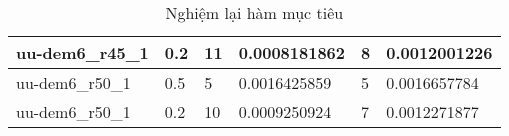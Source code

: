 \begin{table}[]
\begin{tabular}{|l|l|l|l|l|l|}
    uu-dem6\_r45\_1                                & 0.2                                         & 11                             & 0.0008181862                    & 8                              & 0.0012001226                    \\ \hline
    uu-dem6\_r50\_1                                & 0.5                                         & 5                              & 0.0016425859                    & 5                              & 0.0016657784                    \\ \hline
    uu-dem6\_r50\_1                                & 0.2                                         & 10                             & 0.0009250924                    & 7                              & 0.0012271877                    \\ \hline
    \end{tabular}
    \caption{Nghiệm lại hàm mục tiêu}
    \label{check_obj_func}
\end{table}
